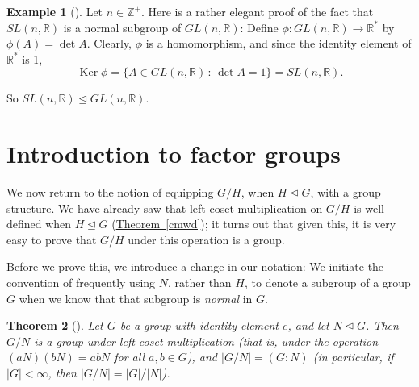 \documentclass[10pt,openany,oneside]{book}
\theoremstyle{plain}
\newtheorem{theorem}{Theorem}[section]
\theoremstyle{definition}
\theoremstyle{definition}
\theoremstyle{definition}
\newtheorem{example}[theorem]{Example}
\theoremstyle{definition}
\numberwithin{equation}{section}
\def\Z{\mathbb{Z}}
\def\R{\mathbb{R}}
\DeclareMathOperator{\Ker}{Ker}
\newcommand{\lt}{<}
\begin{document}
\begin{example}[]\label{slnormgl}
Let \(n\in \Z^+\). Here is a rather elegant proof of the fact that \(SL(n,\R)\) is a normal subgroup of \(GL(n,\R)\): Define \(\phi:
GL(n,\R) \to \R^*\) by \(\phi(A)=\det A\). Clearly, \(\phi\) is a homomorphism, and since the identity element of \(\R^*\) is 1,%
\begin{equation*}
\Ker \phi=\{A\in GL(n,\R)\,:\,\det A= 1\}=SL(n,\R).
\end{equation*}
%
\par
So \(SL(n,\R)\unlhd GL(n,\R)\).%
\end{example}
\typeout{************************************************}
\typeout{************************************************}
\section[{Introduction to factor groups}]{Introduction to factor groups}\label{section-27}
We now return to the notion of equipping \(G/H\), when \(H\unlhd G\), with a group structure. We have already saw that left coset multiplication on \(G/H\) is well defined when \(H\unlhd G\) (\hyperref[cmwd]{Theorem~\ref{cmwd}}); it turns out that given this, it is very easy to prove that \(G/H\) under this operation is a group.%
\par
Before we prove this, we introduce a change in our notation: We initiate the convention of frequently using \(N\), rather than \(H\), to denote a subgroup of a group \(G\) when we know that that subgroup is \emph{normal} in \(G\).%
\begin{theorem}[{}]\label{theorem-55}
Let \(G\) be a group with identity element \(e\), and let \(N\unlhd G\). Then \(G/N\) is a group under left coset multiplication (that is, under the operation \((aN)(bN)=abN\) for all \(a,b\in G\)), and \(|G/N|=(G:N)\) (in particular, if \(|G|\lt \infty\), then \(|G/N|=|G|/|N|\)).%
\end{theorem}
\end{document}
